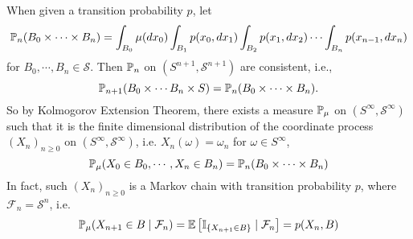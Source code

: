 When given a transition probability $p$, let
\begin{equation*}
    \mathbb{P}_n(B_0 \times \cdots \times B_n) = \int_{B_0} \mu(dx_0)\int_{B_1}p(x_0, dx_1)\int_{B_2}p(x_1,dx_2) \cdots \int_{B_n}p(x_{n-1},dx_n)
\end{equation*}
for $B_0,\cdots,B_n \in \mathcal{S}$. Then $\mathbb{P}_n$ on $(S^{n+1},\mathcal{S}^{n+1})$ are consistent, i.e.,
\begin{equation*}
    \mathbb{P}_{n+1}(B_0 \times \cdots B_n \times S) = \mathbb{P}_n(B_0 \times \cdots \times B_n).
\end{equation*}
So by Kolmogorov Extension Theorem, there exists a measure $\mathbb{P}_\mu$ on $(S^\infty,\mathcal{S}^\infty)$ such that it is the finite dimensional distribution of the coordinate process $(X_n)_{n\geq 0}$ on $(S^\infty,\mathcal{S}^\infty)$, i.e. $X_n(\omega) = \omega_n$ for $\omega \in S^\infty$,
\begin{equation*}
    \mathbb{P}_{\mu}(X_0 \in B_0, \cdots, X_n \in B_n) = \mathbb{P}_{n}(B_0 \times \cdots \times B_n)
\end{equation*}
In fact, such $(X_n)_{n\geq 0}$ is a Markov chain with transition probability $p$, where $\mathcal{F}_n = \mathcal{S}^n$, i.e.
\begin{equation*}
    \mathbb{P}_\mu(X_{n+1} \in B \mid \mathcal{F}_n) = \mathbb{E}\left[\mathbb{I}_{\left\{X_{n+1} \in B\right\}} \mid \mathcal{F}_n\right] = p(X_n, B)
\end{equation*}
